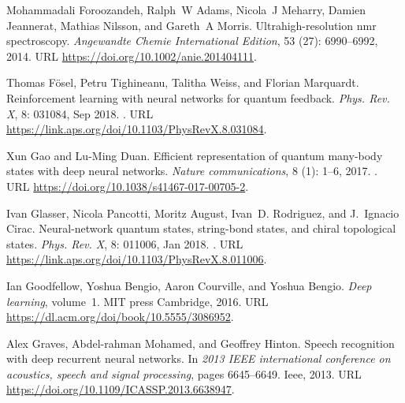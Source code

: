 \documentclass[a4paper,aps,amsmath,amssymb,twocolumn,longbibliography,,accepted=2022-05-17]{quantumarticle}
\begin{document}
\begin{thebibliography}{52}
Mohammadali Foroozandeh, Ralph~W Adams, Nicola~J Meharry, Damien Jeannerat,
  Mathias Nilsson, and Gareth~A Morris.
\newblock Ultrahigh-resolution nmr spectroscopy.
\newblock \emph{Angewandte Chemie International Edition}, 53
  (27): 6990--6992, 2014.
\newblock URL \url{https://doi.org/10.1002/anie.201404111}.

Thomas F\"osel, Petru Tighineanu, Talitha Weiss, and Florian Marquardt.
\newblock Reinforcement learning with neural networks for quantum feedback.
\newblock \emph{Phys. Rev. X}, 8: 031084, Sep 2018.
\newblock {}.
\newblock URL \url{https://link.aps.org/doi/10.1103/PhysRevX.8.031084}.

Xun Gao and Lu-Ming Duan.
\newblock Efficient representation of quantum many-body states with deep neural
  networks.
\newblock \emph{Nature communications}, 8 (1): 1--6, 2017.
\newblock {}.
\newblock URL \url{https://doi.org/10.1038/s41467-017-00705-2}.

Ivan Glasser, Nicola Pancotti, Moritz August, Ivan~D. Rodriguez, and J.~Ignacio
  Cirac.
\newblock Neural-network quantum states, string-bond states, and chiral
  topological states.
\newblock \emph{Phys. Rev. X}, 8: 011006, Jan 2018.
\newblock {}.
\newblock URL \url{https://link.aps.org/doi/10.1103/PhysRevX.8.011006}.

Ian Goodfellow, Yoshua Bengio, Aaron Courville, and Yoshua Bengio.
\newblock \emph{Deep learning}, volume~1.
\newblock MIT press Cambridge, 2016.
\newblock URL \url{https://dl.acm.org/doi/book/10.5555/3086952}.

Alex Graves, Abdel-rahman Mohamed, and Geoffrey Hinton.
\newblock Speech recognition with deep recurrent neural networks.
\newblock In \emph{2013 IEEE international conference on acoustics, speech and
  signal processing}, pages 6645--6649. Ieee, 2013.
\newblock URL \url{https://doi.org/10.1109/ICASSP.2013.6638947}.


\end{thebibliography}
\end{document}
